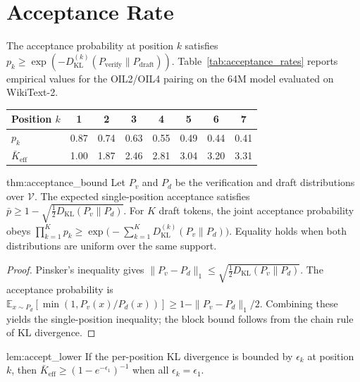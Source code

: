 \section{Acceptance Rate}
\label{sec:acceptance_rate}

The acceptance probability at position $k$ satisfies
$p_k \ge \exp(-D_{\text{KL}}^{(k)}(P_{\text{verify}} \|
P_{\text{draft}}))$.
Table~\ref{tab:acceptance_rates} reports empirical values for the
OIL2/OIL4 pairing on the 64M model evaluated on WikiText-2.

\begin{center}
\begin{tabular}{lccccccc}
\toprule
Position $k$ & 1 & 2 & 3 & 4 & 5 & 6 & 7 \\
\midrule
$p_k$ & 0.87 & 0.74 & 0.63 & 0.55 & 0.49 & 0.44 & 0.41 \\
$\bar{K}_{\text{eff}}$ & 1.00 & 1.87 & 2.46 & 2.81 & 3.04 & 3.20 & 3.31 \\
\bottomrule
\end{tabular}
\end{center}

\label{tab:acceptance_rates}

\begin{mythm}{thm:acceptance_bound}
Let $P_v$ and $P_d$ be the verification and draft distributions over
$\mathcal{V}$. The expected single-position acceptance satisfies
$\bar{p} \ge 1 - \sqrt{\frac{1}{2} D_{\text{KL}}(P_v \| P_d)}$.
For $K$ draft tokens, the joint acceptance probability obeys
$\prod_{k=1}^{K} p_k \ge
\exp\!\bigl(-\textstyle\sum_{k=1}^{K} D_{\text{KL}}^{(k)}(P_v \| P_d)\bigr)$.
Equality holds when both distributions are uniform over the same
support.
\end{mythm}

\begin{proof}
Pinsker's inequality gives $\|P_v - P_d\|_1 \le
\sqrt{\frac{1}{2} D_{\text{KL}}(P_v \| P_d)}$.
The acceptance probability is $\mathbb{E}_{x\sim P_d}[\min(1,
P_v(x)/P_d(x))] \ge 1 - \|P_v - P_d\|_1/2$.
Combining these yields the single-position inequality; the block bound
follows from the chain rule of KL divergence.
\end{proof}

\begin{mylemma}{lem:accept_lower}
If the per-position KL divergence is bounded by $\epsilon_k$ at
position $k$, then $\bar{K}_{\text{eff}} \ge (1 - e^{-\epsilon_1})^{-1}$
when all $\epsilon_k = \epsilon_1$.
\end{mylemma}

